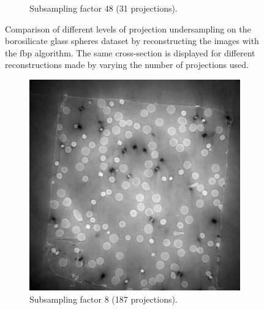 \begin{figure}
\begin{subfigure}[t]{.45\textwidth}
    \caption{Subsampling factor 48 (31 projections). }
  \end{subfigure}
  \caption[Four different levels of projection undersampling on the borosilicate glass spheres dataset]{Comparison of different levels of projection undersampling on the borosilicate glass spheres dataset by reconstructing the images with the \gls{fbp} algorithm. The same cross-section is displayed for different reconstructions made by varying the number of projections used.  }
  \label{fig:tomo00058missingwedgecomparison}
\end{figure}

\begin{figure}
  \begin{subfigure}[t]{.45\textwidth}
    \centering
    \includegraphics[width=\linewidth]{figures/ns8it100000itd4mse035logcosh3.png}
    \caption{Subsampling factor 8 (187 projections). }
  \end{subfigure}
  \hfill
  \begin{subfigure}[t]{.45\textwidth}
    \centering

\end{subfigure}
\end{figure}
